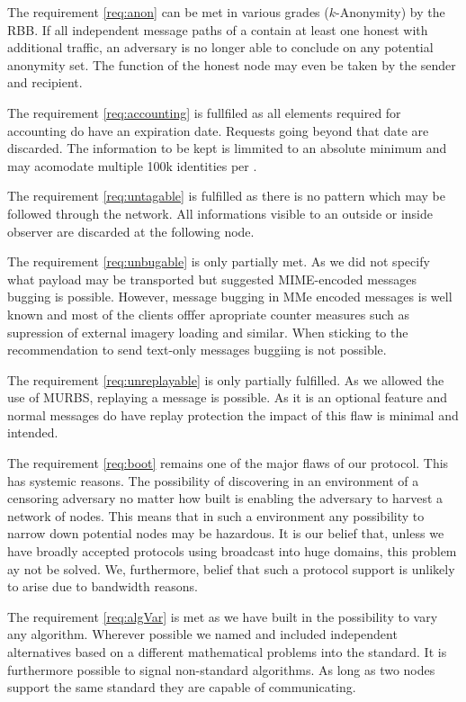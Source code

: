 The requirement \ref{req:anon} can be met in various grades ($k$-Anonymity) by the RBB. If all independent message paths of a \VortexMessage{} contain at least one honest \VortexNode{} with additional traffic, an adversary is no longer able to conclude on any potential anonymity set. The function of the honest node may even be taken by the sender and recipient.

The requirement \ref{req:accounting} is fullfiled as all elements required for accounting do have an expiration date. Requests going beyond that date are discarded. The information to be kept is limmited to an absolute minimum and may acomodate multiple 100k identities per \VortexNode.

The requirement \ref{req:untagable} is fulfilled as there is no pattern which may be followed through the network. All informations visible to an outside or inside observer are discarded at the following node.

The requirement \ref{req:unbugable} is only partially met. As we did not specify what payload may be transported but suggested MIME-encoded messages bugging is possible. However, message bugging in MMe encoded messages is well known and most of the clients offfer apropriate counter measures such as supression of external imagery loading and similar. When sticking to the recommendation to send text-only messages buggiing is not possible.

The requirement \ref{req:unreplayable} is only partially fulfilled. As we allowed the use of MURBS, replaying a message is possible. As it is an optional feature and normal messages do have replay protection the impact of this flaw is minimal and intended.

The requirement \ref{req:boot} remains one of the major flaws of our protocol. This has systemic reasons. The possibility of discovering \VortexNodes{} in an environment of a censoring adversary no matter how built is enabling the adversary to harvest a network of nodes. This means that in such a environment any possibility to narrow down potential nodes may be hazardous. It is our belief that, unless we have broadly accepted protocols using broadcast into huge domains, this problem ay not be solved. We, furthermore, belief that such a protocol support is unlikely to arise due to bandwidth reasons. 

The requirement \ref{req:algVar} is met as we have built in the possibility to vary any algorithm. Wherever possible we named and included independent alternatives based on a different mathematical problems into the standard. It is furthermore possible to signal non-standard algorithms. As long as two nodes support the same standard they are capable of communicating.

